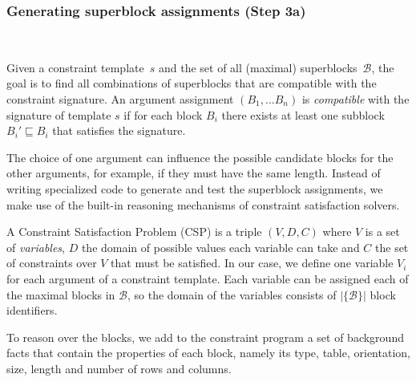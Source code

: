 \documentclass{IEEEtran}
\newcommand{\format}[1]{\textit{#1}\xspace}
\newcommand{\template}{\format{constraint template}}
\newcommand{\CSignature}{Signature\xspace}
\newcommand{\groups}{\ensuremath{\mathcal{B}}\xspace}
\newcommand{\blocks}{\ensuremath{\mathcal{B}}\xspace}
\newcommand{\sbs}{B}
\newcommand{\sbl}[1]{\ensuremath{\sbs_{\textit{#1}}}}
\theoremstyle{definition}
\begin{document}
\subsubsection{Generating superblock assignments (Step 3a)}
\label{sec:algo:super}
\

Given a constraint template~$s$ and the set of all (maximal) superblocks~\blocks, the goal is to find all combinations of superblocks that are compatible with the constraint signature.
An argument assignment $(\sbl{1}, ... \sbl{n})$ is \textit{compatible} with the signature of template $s$ if for each block $\sbl{i}$ there exists at least one subblock $\sbl{i}' \sqsubseteq \sbl{i}$ that satisfies the signature.

The choice of one argument can influence the possible candidate blocks for the other arguments, for example, if they must have the same length.
Instead of writing specialized code to generate and test the superblock assignments, we make use of the built-in reasoning mechanisms of constraint satisfaction solvers.

A Constraint Satisfaction Problem (CSP) is a triple $(V,D,C)$ where $V$ is a set of \textit{variables}, $D$ the domain of possible values each variable can take and $C$ the set of constraints over $V$ that must be satisfied.
In our case, we define one variable $V_i$ for each argument of a constraint template.
Each variable can be assigned each of the maximal blocks in \blocks, so the domain of the variables consists of $|\{\blocks\}|$ block identifiers.


To reason over the blocks, we add to the constraint program a set of background facts that contain the properties of each block, namely its type, table, orientation, size, length and number of rows and columns.
\end{document}

